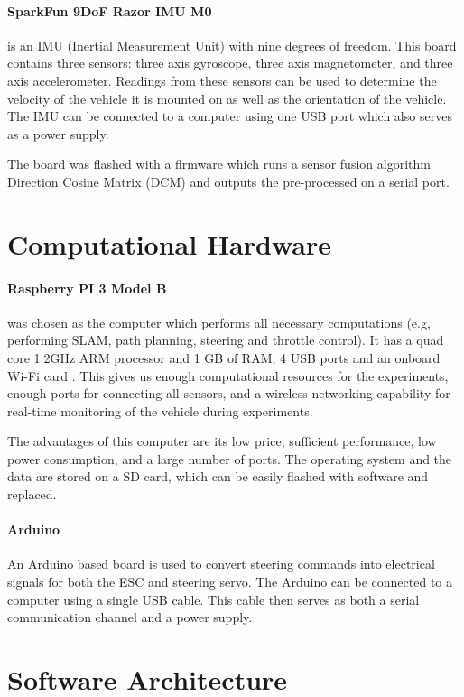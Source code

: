 \paragraph{SparkFun 9DoF Razor IMU M0} is an IMU (Inertial Measurement Unit) with nine degrees of freedom. This board contains three sensors: three axis gyroscope, three axis magnetometer, and three axis accelerometer. Readings from these sensors can be used to determine the velocity of the vehicle it is mounted on as well as the orientation of the vehicle. The IMU can be connected to a computer using one USB port which also serves as a power supply.

The board was flashed with a firmware which runs a sensor fusion algorithm Direction Cosine Matrix (DCM) \cite{dcm} and outputs the pre-processed on a serial port.

\section{Computational Hardware}

\paragraph{Raspberry PI 3 Model B} was chosen as the computer which performs all necessary computations (e.g, performing SLAM, path planning, steering and throttle control). It has a quad core 1.2GHz ARM processor and 1 GB of RAM, 4 USB ports and an onboard Wi-Fi card \cite{raspberry}. This gives us enough computational resources for the experiments, enough ports for connecting all sensors, and a wireless networking capability for real-time monitoring of the vehicle during experiments.

The advantages of this computer are its low price, sufficient performance, low power consumption, and a large number of ports. The operating system and the data are stored on a SD card, which can be easily flashed with software and replaced.

\paragraph{Arduino} An Arduino \cite{arduino} based board is used to convert steering commands into electrical signals for both the ESC and steering servo. The Arduino can be connected to a computer using a single USB cable. This cable then serves as both a serial communication channel and a power supply.

\section{Software Architecture}

